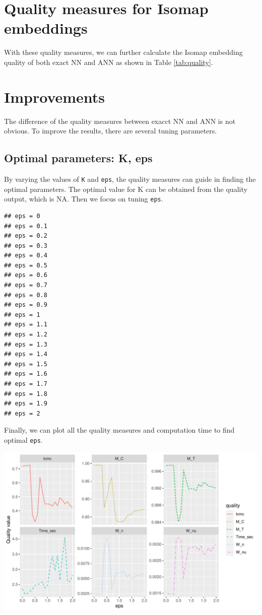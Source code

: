\documentclass[11pt,a4paper,]{article}
\begin{document}
\hypertarget{quality-measures-for-isomap-embeddings}{%
\section{Quality measures for Isomap embeddings}\label{quality-measures-for-isomap-embeddings}}

With these quality measures, we can further calculate the Isomap embedding quality of both exact NN and ANN as shown in Table \ref{tab:quality}.

\hypertarget{improvements}{%
\section{Improvements}\label{improvements}}

The difference of the quality measures between exacct NN and ANN is not obvious. To improve the results, there are several tuning parameters.

\hypertarget{optimal-parameters-k-eps}{%
\subsection{Optimal parameters: K, eps}\label{optimal-parameters-k-eps}}

By varying the values of \texttt{K} and \texttt{eps}, the quality measures can guide in finding the optimal parameters. The optimal value for K can be obtained from the quality output, which is NA. Then we focus on tuning \texttt{eps}.

\begin{verbatim}
## eps = 0 
## eps = 0.1 
## eps = 0.2 
## eps = 0.3 
## eps = 0.4 
## eps = 0.5 
## eps = 0.6 
## eps = 0.7 
## eps = 0.8 
## eps = 0.9 
## eps = 1 
## eps = 1.1 
## eps = 1.2 
## eps = 1.3 
## eps = 1.4 
## eps = 1.5 
## eps = 1.6 
## eps = 1.7 
## eps = 1.8 
## eps = 1.9 
## eps = 2
\end{verbatim}

Finally, we can plot all the quality measures and computation time to find optimal \texttt{eps}.

\includegraphics{Simulation_files/figure-latex/eps_plot-1.pdf}
\end{document}
